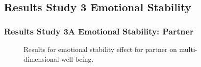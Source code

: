 \documentclass[
  singlecolumn]{article}
\begin{document}
\newpage{}

\subsection{Results Study 3 Emotional
Stability}\label{results-study-3-emotional-stability}

\subsubsection{Results Study 3A Emotional Stability:
Partner}\label{results-study-3a-emotional-stability-partner}

\begin{figure}


\caption{\label{fig-results-emotional-partner}Results for emotional
stability effect for partner on multi-dimensional well-being.}

\end{figure}%

\newpage{}
\end{document}
